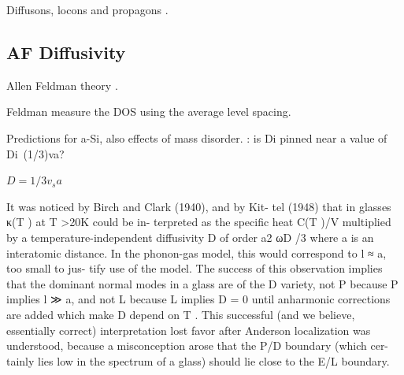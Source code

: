 \documentclass[aps,prb,preprint,superscriptaddress,amsmath,amssymb,floatfix]{revtex4}
\begin{document}
Diffusons, locons and propagons \cite{allen_diffusons_1999}.

\subsection{\label{S-Motivation}AF Diffusivity}
Allen Feldman theory \cite{allen_thermal_1993}.

Feldman measure the DOS using the average level spacing.
\cite{feldman_numerical_1999} 

Predictions for a-Si, also effects of mass disorder.
\cite{feldman_thermal_1993}: is Di pinned near a value of Di~(1/3)va?

$D = 1/3 v_{s} a$

It was noticed by Birch and Clark (1940), and by Kit-
tel (1948) that in glasses κ(T ) at T >20K could be in-
terpreted as the specific heat C(T )/V multiplied by a
temperature-independent diffusivity D of order a2 ωD /3
where a is an interatomic distance. In the phonon-gas
model, this would correspond to l ≈ a, too small to jus-
tify use of the model. The success of this observation
implies that the dominant normal modes in a glass are of
the D variety, not P because P implies l ≫ a, and not L
because L implies D = 0 until anharmonic corrections are
added which make D depend on T . This successful (and
we believe, essentially correct) interpretation lost favor
after Anderson localization was understood, because a
misconception arose that the P/D boundary (which cer-
tainly lies low in the spectrum of a glass) should lie close
to the E/L boundary.

\end{document}
